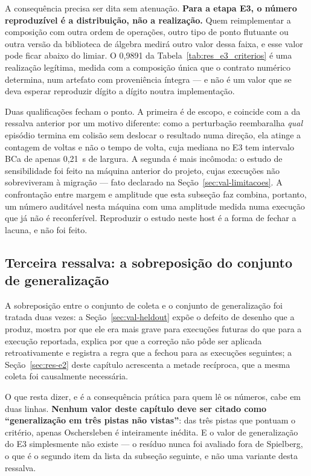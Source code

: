 A consequência precisa ser dita sem atenuação. \textbf{Para a etapa E3, o número
reproduzível é a distribuição, não a realização.} Quem reimplementar a
composição com outra ordem de operações, outro tipo de ponto flutuante ou outra
versão da biblioteca de álgebra medirá outro valor dessa faixa, e esse valor
pode ficar abaixo do limiar. O 0,9891 da Tabela~\ref{tab:res_e3_criterios} é uma
realização legítima, medida com a composição única que o contrato numérico
determina, num artefato com proveniência íntegra --- e não é um valor que se deva
esperar reproduzir dígito a dígito noutra implementação.

Duas qualificações fecham o ponto. A primeira é de escopo, e coincide com a da
ressalva anterior por um motivo diferente: como a perturbação reembaralha
\textit{qual} episódio termina em colisão sem deslocar o resultado numa direção,
ela atinge a contagem de voltas e não o tempo de volta, cuja mediana no E3 tem
intervalo BCa de apenas 0,21~s de largura. A segunda é mais incômoda: o estudo de
sensibilidade foi feito na máquina anterior do projeto, cujas execuções não
sobreviveram à migração --- fato declarado na Seção~\ref{sec:val-limitacoes}. A
confrontação entre margem e amplitude que esta subseção faz combina, portanto, um
número auditável nesta máquina com uma amplitude medida numa execução que já não
é reconferível. Reproduzir o estudo neste host é a forma de fechar a lacuna, e
não foi feito.

\subsection{Terceira ressalva: a sobreposição do conjunto de generalização}

A sobreposição entre o conjunto de coleta e o conjunto de generalização foi
tratada duas vezes: a Seção~\ref{sec:val-heldout} expõe o defeito de desenho que
a produz, mostra por que ele era mais grave para execuções futuras do que para a
execução reportada, explica por que a correção não pôde ser aplicada
retroativamente e registra a regra que a fechou para as execuções seguintes; a Seção~\ref{sec:res-e2} deste capítulo acrescenta a metade
recíproca, que a mesma coleta foi causalmente necessária.

O que resta dizer, e é a consequência prática para quem lê os números, cabe em
duas linhas. \textbf{Nenhum valor deste capítulo deve ser citado como
``generalização em três pistas não vistas''}: das três pistas que pontuam o
critério, apenas Oschersleben é inteiramente inédita. E o valor de generalização
do E3 simplesmente não existe --- o resíduo nunca foi avaliado fora de
Spielberg, o que é o segundo item da lista da subseção seguinte, e não uma
variante desta ressalva.

